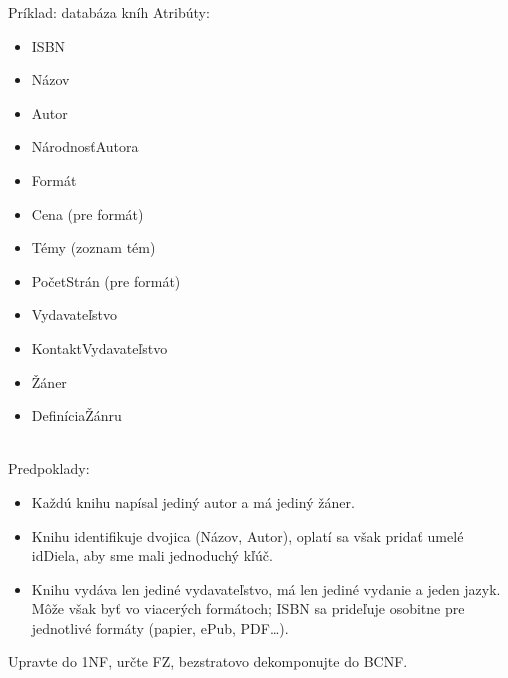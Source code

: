 \documentclass[12pt]{beamer}
\begin{document}
\begin{frame}[fragile]{Príklad: databáza kníh}
Atribúty:\\[3mm]
\begin{minipage}{.4\pdfpagewidth}
\scriptsize
\begin{itemize}
\item ISBN
\item Názov
\item Autor
\item NárodnosťAutora
\item Formát
\item Cena (pre formát)
\end{itemize}
\end{minipage}
\begin{minipage}{.4\pdfpagewidth}
\scriptsize
\begin{itemize}
\item Témy (zoznam tém)
\item PočetStrán (pre formát)
\item Vydavateľstvo
\item KontaktVydavateľstvo
\item Žáner
\item DefiníciaŽánru
\end{itemize}
\end{minipage}
\\[3mm]
Predpoklady:
{
\scriptsize
\begin{itemize}
\item Každú knihu napísal jediný autor a má jediný žáner.
\item Knihu identifikuje dvojica (Názov, Autor), oplatí sa však pridať umelé idDiela, aby sme mali jednoduchý kľúč.
\item Knihu vydáva len jediné vydavateľstvo, má len jediné vydanie a jeden jazyk.
    Môže však byť vo viacerých formátoch; ISBN sa prideľuje osobitne pre jednotlivé formáty (papier, ePub, PDF\dots).
\end{itemize}
}
{
\small
\alert{Upravte do 1NF, určte FZ, bezstratovo dekomponujte do BCNF.}
}
\end{frame}
\end{document}

